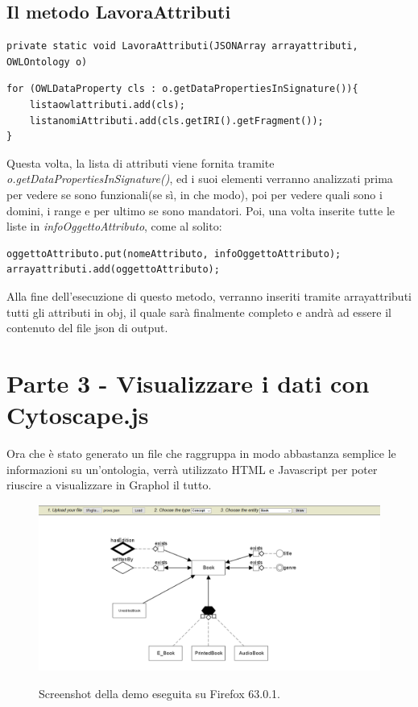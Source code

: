 \documentclass[Lau,binding=0.6cm]{sapthesis}
\begin{document}
\section{Il metodo LavoraAttributi}
\begin{verbatim}
private static void LavoraAttributi(JSONArray arrayattributi, OWLOntology o) 
\end{verbatim}
\begin{verbatim}
for (OWLDataProperty cls : o.getDataPropertiesInSignature()){
    listaowlattributi.add(cls);
    listanomiAttributi.add(cls.getIRI().getFragment());
}
\end{verbatim}

Questa volta, la lista di attributi viene fornita tramite \textit{o.getDataPropertiesInSignature()}, ed i suoi elementi verranno analizzati prima per vedere se sono funzionali(se sì, in che modo), poi per vedere quali sono i domini, i range e per ultimo se sono mandatori. Poi, una volta inserite tutte le liste in \textit{infoOggettoAttributo}, come al solito:
\begin{verbatim}
oggettoAttributo.put(nomeAttributo, infoOggettoAttributo);
arrayattributi.add(oggettoAttributo);
\end{verbatim}
Alla fine dell'esecuzione di questo metodo, verranno inseriti tramite arrayattributi tutti gli attributi in obj, il quale sarà finalmente completo e andrà ad essere il contenuto del file json di output.

\chapter{Parte 3 - Visualizzare i dati con Cytoscape.js }
Ora che è stato generato un file che raggruppa in modo abbastanza semplice le informazioni su un'ontologia, verrà utilizzato HTML e Javascript per poter riuscire a visualizzare in Graphol il tutto.

\begin{figure}[H]
\centering
\includegraphics[width=1\textwidth]{demo}\\[3ex]
\caption{ Screenshot della demo eseguita su Firefox 63.0.1. }
\label{fig:largenenough}
\end{figure}
\end{document}
